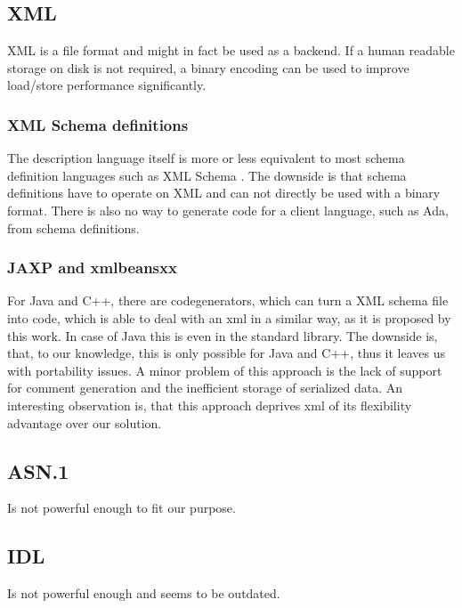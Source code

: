 \documentclass[a4paper,10pt]{article}
\begin{document}
\subsection*{XML}

XML is a file format and might in fact be used as a backend. If a human readable storage on disk is not required, a binary encoding can be used to improve load/store performance significantly. 


\subsubsection*{XML Schema definitions}

The description language itself is more or less equivalent to most schema definition languages such as XML Schema . The downside is that schema definitions have to operate on XML and can not directly be used with a binary format. There is also
no way to generate code for a client language, such as Ada, from schema definitions.

\subsubsection*{JAXP and xmlbeansxx}

For Java and C++, there are codegenerators, which can turn a XML schema file into code, which is able to deal with an xml in a similar way, as it is proposed by this work. In case of Java this is even in the standard library. The downside is, that, to our knowledge, this is only possible for Java and C++, thus it leaves us with portability issues. A minor problem of this approach is the lack of support for comment generation and the inefficient storage of serialized data.
An interesting observation is, that this approach deprives xml of its flexibility advantage over our solution. 


\subsection*{ASN.1}

Is not powerful enough to fit our purpose.

\subsection*{IDL}

 Is not powerful enough and seems to be outdated.
\end{document}
